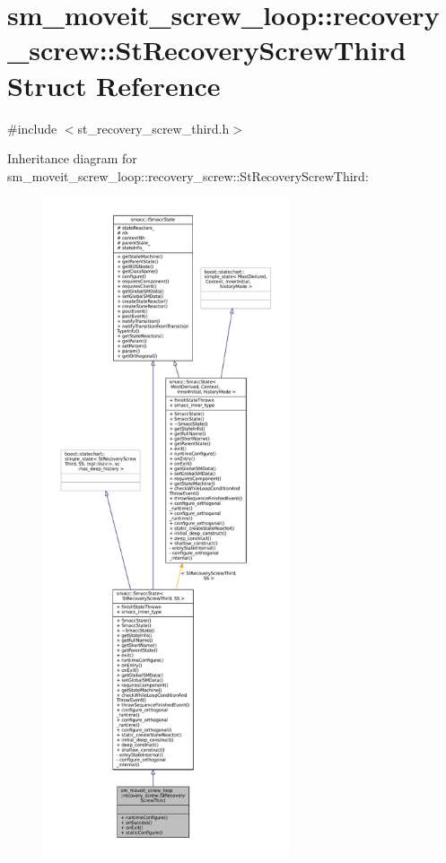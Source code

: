 \hypertarget{structsm__moveit__screw__loop_1_1recovery__screw_1_1StRecoveryScrewThird}{}\section{sm\+\_\+moveit\+\_\+screw\+\_\+loop\+:\+:recovery\+\_\+screw\+:\+:St\+Recovery\+Screw\+Third Struct Reference}
\label{structsm__moveit__screw__loop_1_1recovery__screw_1_1StRecoveryScrewThird}


{\ttfamily \#include $<$st\+\_\+recovery\+\_\+screw\+\_\+third.\+h$>$}



Inheritance diagram for sm\+\_\+moveit\+\_\+screw\+\_\+loop\+:\+:recovery\+\_\+screw\+:\+:St\+Recovery\+Screw\+Third\+:
\nopagebreak
\begin{figure}[H]
\begin{center}
\leavevmode
\includegraphics[height=550pt]{structsm__moveit__screw__loop_1_1recovery__screw_1_1StRecoveryScrewThird__inherit__graph}
\end{center}
\end{figure}


